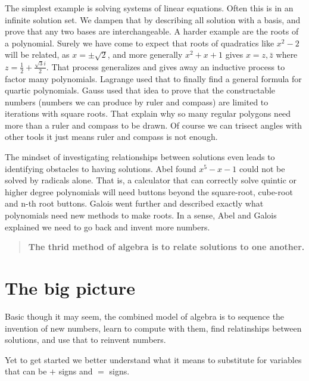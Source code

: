 The simplest example is solving systems of linear equations.  Often 
this is in an infinite solution set.  We dampen that by describing all 
solution with a basis, and prove that any two bases are interchangeable.
A harder example are the roots of a polynomial.  Surely we have come 
to expect that roots of quadratics like $x^2-2$ will be related, 
as $x=\pm \sqrt{2}$, and more generally $x^2+x+1$ gives 
$x=z,\bar{z}$ where $z=\frac{1}{2}+\frac{\sqrt{3}i}{2}$.  That process 
generalizes and gives away an inductive process to factor many polynomials.
Lagrange used that to finally  find a general formula for quartic polynomials.
Gauss used that idea to prove that the constructable numbers (numbers we can 
produce by ruler and compass) are limited to iterations with square roots.
That explain why so many regular polygons need more than a ruler and compass 
to be drawn.  Of course we can trisect angles with 
other tools it just means ruler and compass is not enough.

The mindset of investigating relationships between solutions even leads to
identifying obstacles to having solutions.  Abel found $x^5-x-1$ could not be
solved by radicals alone.  That is, a calculator that can correctly solve
quintic or higher degree polynomials will need buttons beyond the square-root,
cube-root and n-th root buttons.  Galois went further and described exactly what
polynomials need new methods to make roots.  In a sense, Abel and Galois
explained we need to go back and invent more numbers.

\begin{quote}
    \textbf{The thrid method of algebra is to relate solutions to one another.}
\end{quote}


\section{The big picture}
Basic though it may seem, the combined model of algebra is to sequence the 
invention of new numbers, learn to compute with them, find relatinships 
between solutions, and use that to reinvent numbers.
\begin{center}
\end{center}


Yet to get started we better understand what it means to substitute 
for variables that can be $+$ signs and $=$ signs.